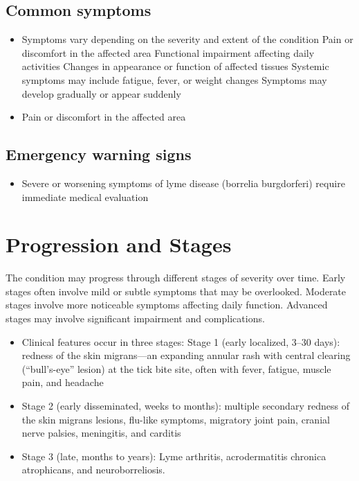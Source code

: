 \subsection{Common symptoms}
\begin{itemize}[noitemsep]
  \item Symptoms vary depending on the severity and extent of the condition Pain or discomfort in the affected area Functional impairment affecting daily activities Changes in appearance or function of affected tissues Systemic symptoms may include fatigue, fever, or weight changes Symptoms may develop gradually or appear suddenly
  \item Pain or discomfort in the affected area
  \end{itemize}

\subsection{Emergency warning signs}
\begin{itemize}[noitemsep]
  \item Severe or worsening symptoms of lyme disease (borrelia burgdorferi) require immediate medical evaluation
\end{itemize}
\section{Progression and Stages}
The condition may progress through different stages of severity over time. Early stages often involve mild or subtle symptoms that may be overlooked. Moderate stages involve more noticeable symptoms affecting daily function. Advanced stages may involve significant impairment and complications.

\begin{itemize}[noitemsep]
  \item Clinical features occur in three stages: Stage 1 (early localized, 3--30 days): redness of the skin migrans---an expanding annular rash with central clearing (``bull's-eye'' lesion) at the tick bite site, often with fever, fatigue, muscle pain, and headache
  \item Stage 2 (early disseminated, weeks to months): multiple secondary redness of the skin migrans lesions, flu-like symptoms, migratory joint pain, cranial nerve palsies, meningitis, and carditis
  \item Stage 3 (late, months to years): Lyme arthritis, acrodermatitis chronica atrophicans, and neuroborreliosis.
\end{itemize}
